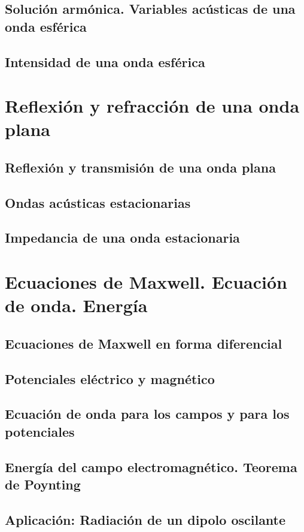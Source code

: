 \documentclass[a4paper]{book}
\numberwithin{figure}{chapter}
\numberwithin{equation}{chapter}
\begin{document}
\section{Solución armónica. Variables acústicas de una onda esférica}
\section{Intensidad de una onda esférica}

\chapter{Reflexión y refracción de una onda plana}
\section{Reflexión y transmisión de una onda plana}
\section{Ondas acústicas estacionarias}
\section{Impedancia de una onda estacionaria}

\chapter{Ecuaciones de Maxwell. Ecuación de onda. Energía}
\section{Ecuaciones de Maxwell en forma diferencial}
\section{Potenciales eléctrico y magnético}
\section{Ecuación de onda para los campos y para los potenciales}
\section{Energía del campo electromagnético. Teorema de Poynting}
\section{Aplicación: Radiación de un dipolo oscilante}
\end{document}
